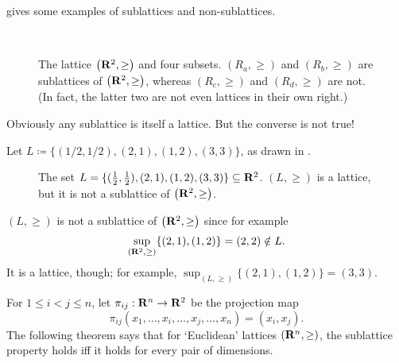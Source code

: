 \documentclass[11pt,letterpaper,reqno,oneside]{article}
\begin{document}
\noindent {} gives some examples of sublattices and non-sublattices.
%
\begin{figure}
	\begin{subfigure}{0.5\textwidth}
		\centering
		
		\caption{}
	\end{subfigure}
	\begin{subfigure}{0.5\textwidth}
		\centering
		
		\caption{}
	\end{subfigure}
	\\
	\begin{subfigure}{0.5\textwidth}
		\centering
		
		\caption{}
	\end{subfigure}
	\begin{subfigure}{0.5\textwidth}
		\centering
		
		\caption{}
	\end{subfigure}
	\caption{The lattice $\left(\mathbf{R}^2,\geq\right)$ and four subsets. $(R_a,\geq)$ and $(R_b,\geq)$ are sublattices of $\left(\mathbf{R}^2,\geq\right)$, whereas $(R_c,\geq)$ and $(R_d,\geq)$ are not. (In fact, the latter two are not even lattices in their own right.)}
	\label{fig:example_sublattice}
\end{figure}


Obviously any sublattice is itself a lattice. But the converse is not true!
%
\begin{example}
	Let $L \coloneqq \{ (1/2,1/2),(2,1),(1,2),(3,3) \}$, as drawn in .
	\begin{figure}
		\centering
		
		\caption{The set $L = \{ (\tfrac{1}{2},\tfrac{1}{2}), (2,1), (1,2), (3,3) \} \subseteq \mathbf{R}^2$. $(L,\geq)$ is a lattice, but it is not a sublattice of $\left(\mathbf{R}^2,\geq\right)$.}
		\label{fig:example_sublattice3}
	\end{figure}
	$(L,\geq)$ is not a sublattice of $\left(\mathbf{R}^2,\geq\right)$ since for example
	\begin{equation*}
		\sup_{(\mathbf{R}^2,\geq)} \{ (2,1), (1,2) \} = (2,2) \notin L .
	\end{equation*}
	It is a lattice, though; for example, $\sup_{(L,\geq)} \{ (2,1), (1,2) \} = (3,3)$.
\end{example}


For $1 \leq i < j \leq n$, let $\pi_{ij} : \mathbf{R}^n \to \mathbf{R}^2$ be the projection map
%
\begin{equation*}
	\pi_{ij}(x_1,\dots,x_i,\dots,x_j,\dots,x_n) = (x_i,x_j) .
\end{equation*}
%
The following theorem says that for `Euclidean' lattices $\left(\mathbf{R}^n,\geq\right)$, the sublattice property holds iff it holds for every pair of dimensions.
\end{document}
